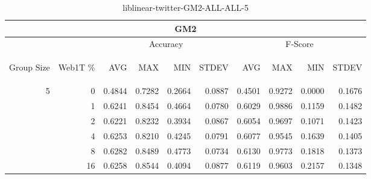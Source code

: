 \begin{center}
\begin{table}[htbp] 
 \begin{center}
\begin{tabular}{ | r | r | r | r | r | r | r | r | r | r |}
\hline
\multicolumn{10}{|c|}{GM2}\\
\hline
 & & \multicolumn{4}{|c|}{Accuracy} & \multicolumn{4}{|c|}{F-Score}\\ \cline{3-10}
\begin{sideways}Group Size\end{sideways} & \begin{sideways}Web1T \%\end{sideways} & \begin{sideways}AVG\end{sideways} & \begin{sideways}MAX\end{sideways} & \begin{sideways}MIN\end{sideways} & \begin{sideways}STDEV\end{sideways} & \begin{sideways}AVG\end{sideways} & \begin{sideways}MAX\end{sideways} & \begin{sideways}MIN\end{sideways} & \begin{sideways}STDEV\end{sideways}\\
\hline
\multirow{5}{*}{5}
 & 0 & 0.4844 & 0.7282 & 0.2664 & 0.0887 & 0.4501 & 0.9272 & 0.0000 & 0.1676\\ \cline{2-10}
 & 1 & 0.6241 & 0.8454 & 0.4664 & 0.0780 & 0.6029 & 0.9886 & 0.1159 & 0.1482\\ \cline{2-10}
 & 2 & 0.6221 & 0.8232 & 0.3934 & 0.0867 & 0.6054 & 0.9697 & 0.1071 & 0.1423\\ \cline{2-10}
 & 4 & 0.6253 & 0.8210 & 0.4245 & 0.0791 & 0.6077 & 0.9545 & 0.1639 & 0.1405\\ \cline{2-10}
 & 8 & 0.6282 & 0.8489 & 0.4773 & 0.0734 & 0.6130 & 0.9773 & 0.1818 & 0.1373\\ \cline{2-10}
 & 16 & 0.6258 & 0.8544 & 0.4094 & 0.0877 & 0.6119 & 0.9603 & 0.2157 & 0.1348\\ \cline{2-10}
\hline
\end{tabular}
\caption{liblinear-twitter-GM2-ALL-ALL-5}
\label{table:liblinear-twitter-GM2-ALL-ALL-5}
\end{center}
 \end{table}
\end{center}

